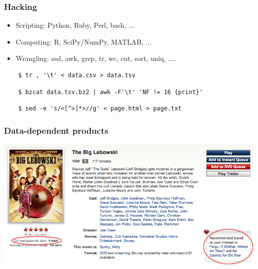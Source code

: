 \documentclass[xcolor=dvipsnames, 9pt]{beamer}
\begin{document}
\begin{frame}[fragile]
  \frametitle{Hacking}

  \begin{itemize}
    \item Scripting: Python, Ruby, Perl, bash, ...
    \item Computing: R, SciPy/NumPy, MATLAB, ...
    \item Wrangling: sed, awk, grep, tr, wc, cut, sort, uniq, ....
  \end{itemize}

  \begin{verbatim}
    $ tr , '\t' < data.csv > data.tsv
  \end{verbatim}

  \begin{verbatim}
    $ bzcat data.tsv.bz2 | awk -F'\t' 'NF != 16 {print}'
  \end{verbatim}

  \begin{verbatim}
    $ sed -e 's/<[^>]*>//g' < page.html > page.txt
  \end{verbatim}

\end{frame}



\begin{frame}
  \frametitle{Data-dependent products}

    \begin{center}
      \includegraphics[width=\textwidth]{big_lebowski.png}
    \end{center}


\end{frame}
\end{document}
